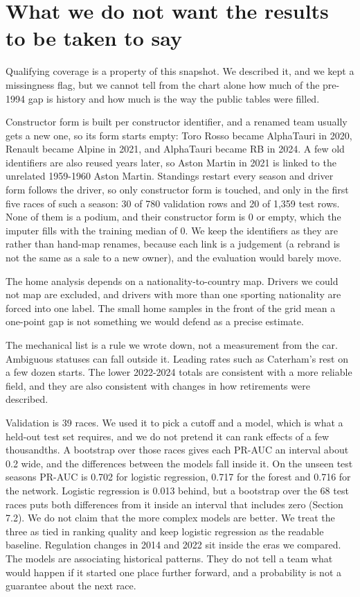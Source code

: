 \documentclass[10pt,a4paper]{article}
\begin{document}
\section{What we do not want the results to be taken to say}


Qualifying coverage is a property of this snapshot. We described it, and we kept a missingness flag, but we cannot tell from the chart alone how much of the pre-1994 gap is history and how much is the way the public tables were filled.


Constructor form is built per constructor identifier, and a renamed team usually gets a new one, so its form starts empty: Toro Rosso became AlphaTauri in 2020, Renault became Alpine in 2021, and AlphaTauri became RB in 2024. A few old identifiers are also reused years later, so Aston Martin in 2021 is linked to the unrelated 1959-1960 Aston Martin. Standings restart every season and driver form follows the driver, so only constructor form is touched, and only in the first five races of such a season: 30 of 780 validation rows and 20 of 1,359 test rows. None of them is a podium, and their constructor form is 0 or empty, which the imputer fills with the training median of 0. We keep the identifiers as they are rather than hand-map renames, because each link is a judgement (a rebrand is not the same as a sale to a new owner), and the evaluation would barely move.


The home analysis depends on a nationality-to-country map. Drivers we could not map are excluded, and drivers with more than one sporting nationality are forced into one label. The small home samples in the front of the grid mean a one-point gap is not something we would defend as a precise estimate.


The mechanical list is a rule we wrote down, not a measurement from the car. Ambiguous statuses can fall outside it. Leading rates such as Caterham's rest on a few dozen starts. The lower 2022-2024 totals are consistent with a more reliable field, and they are also consistent with changes in how retirements were described.


Validation is 39 races. We used it to pick a cutoff and a model, which is what a held-out test set requires, and we do not pretend it can rank effects of a few thousandths. A bootstrap over those races gives each PR-AUC an interval about 0.2 wide, and the differences between the models fall inside it. On the unseen test seasons PR-AUC is 0.702 for logistic regression, 0.717 for the forest and 0.716 for the network. Logistic regression is 0.013 behind, but a bootstrap over the 68 test races puts both differences from it inside an interval that includes zero (Section 7.2). We do not claim that the more complex models are better. We treat the three as tied in ranking quality and keep logistic regression as the readable baseline. Regulation changes in 2014 and 2022 sit inside the eras we compared. The models are associating historical patterns. They do not tell a team what would happen if it started one place further forward, and a probability is not a guarantee about the next race.
\end{document}

